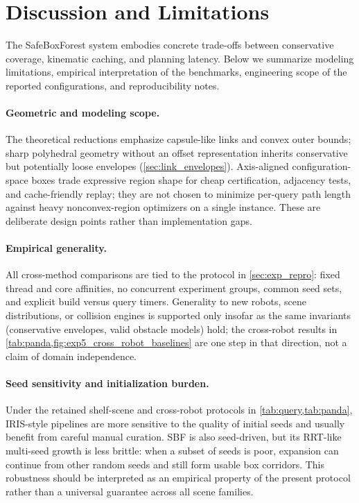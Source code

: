 \documentclass[journal]{IEEEtran}
\begin{document}

\section{Discussion and Limitations}\label{sec:discussion}

The SafeBoxForest system embodies concrete trade-offs between conservative
coverage, kinematic caching, and planning latency. Below we summarize modeling
limitations, empirical interpretation of the benchmarks, engineering scope of the
reported configurations, and reproducibility notes.

\paragraph{Geometric and modeling scope.}
The theoretical reductions emphasize capsule-like links and convex outer bounds;
sharp polyhedral geometry without an offset representation inherits conservative
but potentially loose envelopes (\cref{sec:link_envelopes}). Axis-aligned
configuration-space boxes trade expressive region shape for cheap certification,
adjacency tests, and cache-friendly replay; they are not chosen to minimize
per-query path length against heavy nonconvex-region optimizers on a single
instance. These are deliberate design points rather than implementation gaps.

\paragraph{Empirical generality.}
All cross-method comparisons are tied to the protocol in
\cref{sec:exp_repro}: fixed thread and core affinities, no concurrent
experiment groups, common seed sets, and explicit build versus query timers.
Generality to new robots, scene distributions, or collision engines is
supported only insofar as the same invariants (conservative envelopes, valid
obstacle models) hold; the cross-robot results in
\cref{tab:panda,fig:exp5_cross_robot_baselines} are one step in that
direction, not a claim of domain independence.

\paragraph{Seed sensitivity and initialization burden.}
Under the retained shelf-scene and cross-robot protocols in
\cref{tab:query,tab:panda}, IRIS-style pipelines are more sensitive to the
quality of initial seeds and usually benefit from careful manual curation.
SBF is also seed-driven, but its RRT-like multi-seed growth is less brittle:
when a subset of seeds is poor, expansion can continue from other random seeds
and still form usable box corridors. This robustness should be interpreted
as an empirical property of the present protocol rather than a universal
guarantee across all scene families.
\end{document}
